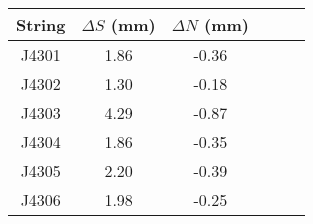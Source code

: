 \begin{tabular}{cccccc}
\toprule
String &  $\Delta S$ (mm) &  $\Delta N$ (mm) \\
\midrule
 J4301 &             1.86 &            -0.36 \\
 J4302 &             1.30 &            -0.18 \\
 J4303 &             4.29 &            -0.87 \\
 J4304 &             1.86 &            -0.35 \\
 J4305 &             2.20 &            -0.39 \\
 J4306 &             1.98 &            -0.25 \\
\bottomrule
\end{tabular}

